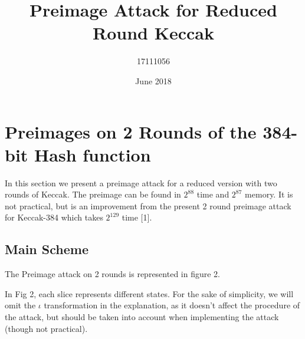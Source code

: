 \documentclass{article}
\title{Preimage Attack for Reduced Round Keccak}
\author{17111056}
\date{June 2018}
\begin{document}
\maketitle

\section{Preimages on 2 Rounds of the 384-bit Hash function}

\begin{center}
\end{center}

In this section we present a preimage attack for a reduced version with two rounds of Keccak. The preimage can be found in $2^{88}$ time and $2^{87}$ memory. It is not practical, but is an improvement from the present 2 round preimage attack for Keccak-384 which takes $2^{129}$ time [1].

\subsection{Main Scheme}
The Preimage attack on 2 rounds is represented in figure 2.\newline

In Fig 2, each slice represents different states. For the sake of simplicity, we will omit the $\iota$ transformation in the explanation, as it doesn't affect the procedure of the attack, but should be taken into account when implementing the attack (though not practical).
\end{document}

